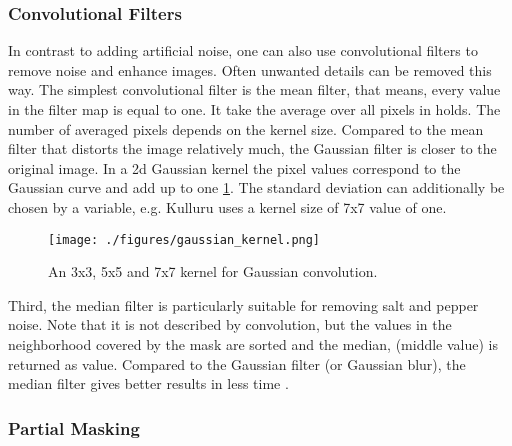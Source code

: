 \begin{comment}
Another intensity shifting technique has been introduced by Hussain, where all pixels of the image \( I \) are elementwise taken to the power \( p \). The augmented image \( I_a \) is then returned by fuction defined as
\begin{equation}
    I_a = \text{sign}(I) \times |I|^{n \times r + 1}
\end{equation}
The power \( p \) is calculated using a random float \( n \) taken from a Gaussian distribution with mean 0 and variance 1. \( r \) is a number less than 1.
\end{comment}

\subsubsection{Convolutional Filters}

In contrast to adding artificial noise, one can also use convolutional filters to remove noise and enhance images. Often unwanted details can be removed this way. The simplest convolutional filter is the mean filter, that means, every value in the filter map is equal to one. It take the average over all pixels in holds. The number of averaged pixels depends on the kernel size. Compared to the mean filter that distorts the image relatively much, the Gaussian filter \cite{Kolluru.2018} is closer to the original image. In a \acrshort{2d} Gaussian kernel the pixel values correspond to the Gaussian curve and add up to one \cref{fig:gaussianfilter}. The standard deviation can additionally be chosen by a variable, e.g. Kulluru uses a kernel size of 7x7 value of one.
\begin{figure}[htp]
    \centering
    \texttt{[image: ./figures/gaussian\_kernel.png]}
    \caption[Gaussian convolution]{An 3x3, 5x5 and 7x7 kernel for Gaussian convolution. \cite{Shipitko.2018}}
    \label{fig:gaussianfilter}
\end{figure}
Third, the median \cite{Kihara.2019} filter is particularly suitable for removing salt and pepper noise. Note that it is not described by convolution, but the values in the neighborhood covered by the mask are sorted and the median, (middle value) is returned as value. Compared to the Gaussian filter (or Gaussian blur), the median filter gives better results in less time \cite{KumarArvind.2020}.

\subsubsection{Partial Masking}

